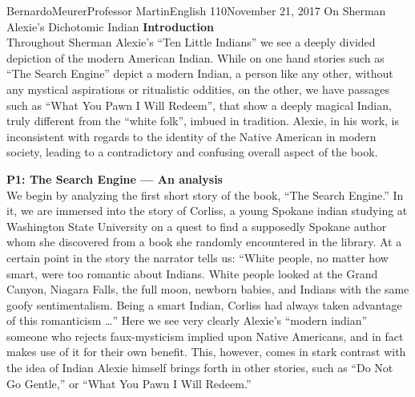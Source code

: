 \documentclass[12pt,letterpaper]{article}
\begin{document}
    \begin{mla}{Bernardo}{Meurer}{Professor Martin}{English 110}{November 21, 2017}%
        {On Sherman Alexie's Dichotomic Indian }
        \noindent\textbf{Introduction}\\
        Throughout Sherman Alexie's ``Ten Little Indians'' we see a deeply divided depiction of the modern American Indian. While on one hand stories such as ``The Search Engine'' depict a modern Indian, a person like any other, without any mystical aspirations or ritualistic oddities, on the other, we have passages such as ``What You Pawn I Will Redeem'', that show a deeply magical Indian, truly different from the ``white folk'', imbued in tradition. Alexie, in his work, is inconsistent with regards to the identity of the Native American in modern society, leading to a contradictory and confusing overall aspect of the book.

        \noindent\textbf{P1: The Search Engine --- An analysis}\\
        We begin by analyzing the first short story of the book, ``The Search Engine.'' In it, we are immersed into the story of Corliss, a young Spokane indian studying at Washington State University on a quest to find a supposedly Spokane author whom she discovered from a book she randomly encountered in the library. At a certain point in the story the narrator tells us: ``White people, no matter how smart, were too romantic about Indians. White people looked at the Grand Canyon, Niagara Falls, the full moon, newborn babies, and Indians with the same goofy sentimentalism. Being a smart Indian, Corliss had always taken advantage of this romanticism \ldots'' Here we see very clearly Alexie's ``modern indian'' someone who rejects faux-mysticism implied upon Native Americans, and in fact makes use of it for their own benefit. This, however, comes in stark contrast with the idea of Indian Alexie himself brings forth in other stories, such as ``Do Not Go Gentle,'' or ``What You Pawn I Will Redeem.''


\end{mla}
\end{document}
